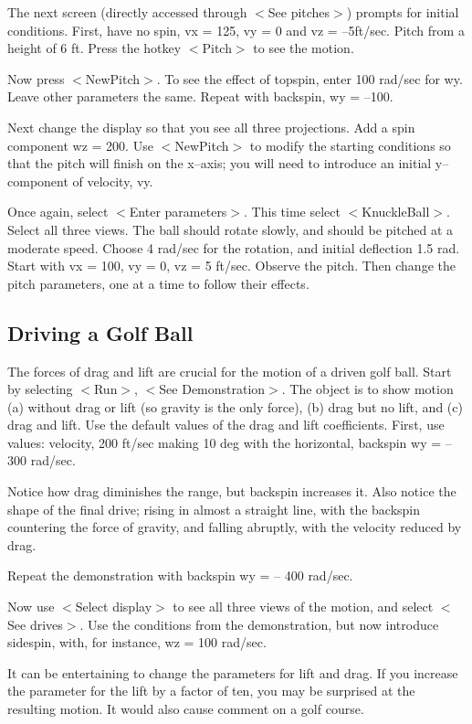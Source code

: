    The next screen (directly accessed through $<$See pitches$>$) prompts
for initial conditions. First, have no spin, vx = 125, vy = 0 and
vz = --5ft/sec. Pitch from a height of 6 ft. Press the hotkey $<$Pitch$>$ to
 see the motion.

   Now press $<$NewPitch$>$. To see the effect of topspin, enter 100 rad/sec
for wy. Leave other parameters the same. Repeat with backspin, wy = --100.

   Next change the display so that you see all three projections. Add
a spin component wz = 200. Use $<$NewPitch$>$ to modify the starting
conditions so that the pitch will finish on the x--axis; you will need
to introduce an initial y--component of velocity, vy.

   Once again, select $<$Enter parameters$>$. This time select $<$KnuckleBall$>$.
Select all three views. The ball should rotate slowly, and should be
pitched at a moderate speed. Choose 4 rad/sec for the rotation, and
initial deflection 1.5 rad. Start with vx = 100, vy = 0, vz = 5 ft/sec.
Observe the pitch. Then change the pitch parameters, one at a time to
follow their effects.



\subsection{Driving a Golf Ball}

   The forces of drag and lift are crucial for the motion of a driven
golf ball. Start by selecting $<$Run$>$, $<$See Demonstration$>$. The object
is to show motion (a) without drag or lift (so gravity is the only
force), (b) drag but no lift, and (c) drag and lift. Use the default 
values of the drag and lift coefficients. First, use values: velocity,
200 ft/sec making 10 deg with the horizontal, backspin wy = -- 300 rad/sec.

   Notice how drag diminishes the range, but backspin increases it.
Also notice the shape of the final drive; rising in almost a straight
line, with the backspin countering the force of gravity, and falling
abruptly, with the velocity reduced by drag.

   Repeat the demonstration with backspin wy = -- 400 rad/sec.

   Now use $<$Select display$>$ to see all three views of the motion,
and select $<$See drives$>$. Use the conditions from the demonstration,
but now introduce sidespin, with, for instance, wz = 100 rad/sec.

   It can be entertaining to change the parameters for lift and drag.
If you increase the parameter for the lift by a factor of ten, you
may be surprised at the resulting motion. It would also cause comment
on a golf course.


